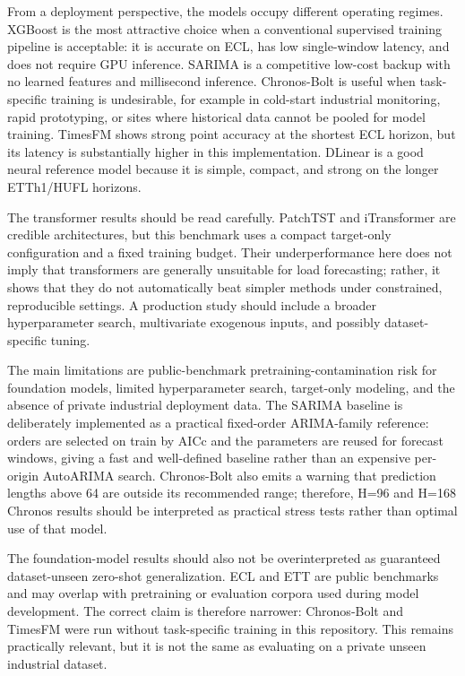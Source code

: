 \documentclass[conference]{IEEEtran}
\begin{document}
From a deployment perspective, the models occupy different operating regimes. XGBoost is the most attractive choice when a conventional supervised training pipeline is acceptable: it is accurate on ECL, has low single-window latency, and does not require GPU inference. SARIMA is a competitive low-cost backup with no learned features and millisecond inference. Chronos-Bolt is useful when task-specific training is undesirable, for example in cold-start industrial monitoring, rapid prototyping, or sites where historical data cannot be pooled for model training. TimesFM shows strong point accuracy at the shortest ECL horizon, but its latency is substantially higher in this implementation. DLinear is a good neural reference model because it is simple, compact, and strong on the longer ETTh1/HUFL horizons.

The transformer results should be read carefully. PatchTST and iTransformer are credible architectures, but this benchmark uses a compact target-only configuration and a fixed training budget. Their underperformance here does not imply that transformers are generally unsuitable for load forecasting; rather, it shows that they do not automatically beat simpler methods under constrained, reproducible settings. A production study should include a broader hyperparameter search, multivariate exogenous inputs, and possibly dataset-specific tuning.

The main limitations are public-benchmark pretraining-contamination risk for foundation models, limited hyperparameter search, target-only modeling, and the absence of private industrial deployment data. The SARIMA baseline is deliberately implemented as a practical fixed-order ARIMA-family reference: orders are selected on train by AICc and the parameters are reused for forecast windows, giving a fast and well-defined baseline rather than an expensive per-origin AutoARIMA search. Chronos-Bolt also emits a warning that prediction lengths above 64 are outside its recommended range; therefore, H=96 and H=168 Chronos results should be interpreted as practical stress tests rather than optimal use of that model.

The foundation-model results should also not be overinterpreted as guaranteed dataset-unseen zero-shot generalization. ECL and ETT are public benchmarks and may overlap with pretraining or evaluation corpora used during model development. The correct claim is therefore narrower: Chronos-Bolt and TimesFM were run without task-specific training in this repository. This remains practically relevant, but it is not the same as evaluating on a private unseen industrial dataset.
\end{document}
